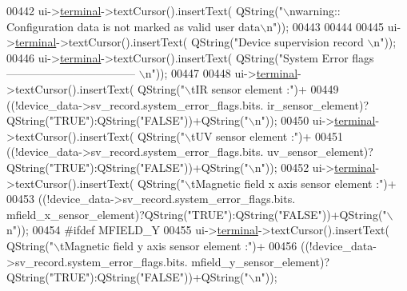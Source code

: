 \begin{DoxyCode}
00442        ui->\hyperlink{a00080_aae71c46ea4546df5994735dee573b2dd}{terminal}->textCursor().insertText( QString(\textcolor{stringliteral}{"\(\backslash\)nwarning:: Configuration data is not marked
       as valid user data\(\backslash\)n"}));
00443 
00444 
00445        ui->\hyperlink{a00080_aae71c46ea4546df5994735dee573b2dd}{terminal}->textCursor().insertText( QString(\textcolor{stringliteral}{"Device supervision record \(\backslash\)n"}));
00446        ui->\hyperlink{a00080_aae71c46ea4546df5994735dee573b2dd}{terminal}->textCursor().insertText( QString(\textcolor{stringliteral}{"System Error flags 
       ----------------------------------- \(\backslash\)n"}));
00447 
00448        ui->\hyperlink{a00080_aae71c46ea4546df5994735dee573b2dd}{terminal}->textCursor().insertText( QString(\textcolor{stringliteral}{"\(\backslash\)tIR sensor element :"})+
00449                                             ((!device\_data->sv\_record.system\_error\_flags.bits.
      ir\_sensor\_element)?QString(\textcolor{stringliteral}{"TRUE"}):QString(\textcolor{stringliteral}{"FALSE"}))+QString(\textcolor{stringliteral}{"\(\backslash\)n"}));
00450        ui->\hyperlink{a00080_aae71c46ea4546df5994735dee573b2dd}{terminal}->textCursor().insertText( QString(\textcolor{stringliteral}{"\(\backslash\)tUV sensor element :"})+
00451                                             ((!device\_data->sv\_record.system\_error\_flags.bits.
      uv\_sensor\_element)?QString(\textcolor{stringliteral}{"TRUE"}):QString(\textcolor{stringliteral}{"FALSE"}))+QString(\textcolor{stringliteral}{"\(\backslash\)n"}));
00452        ui->\hyperlink{a00080_aae71c46ea4546df5994735dee573b2dd}{terminal}->textCursor().insertText( QString(\textcolor{stringliteral}{"\(\backslash\)tMagnetic field x axis sensor element :"})+
00453                                             ((!device\_data->sv\_record.system\_error\_flags.bits.
      mfield\_x\_sensor\_element)?QString(\textcolor{stringliteral}{"TRUE"}):QString(\textcolor{stringliteral}{"FALSE"}))+QString(\textcolor{stringliteral}{"\(\backslash\)n"}));
00454 \textcolor{preprocessor}{#ifdef MFIELD\_Y}
00455        ui->\hyperlink{a00080_aae71c46ea4546df5994735dee573b2dd}{terminal}->textCursor().insertText( QString(\textcolor{stringliteral}{"\(\backslash\)tMagnetic field y axis sensor element :"})+
00456                                             ((!device\_data->sv\_record.system\_error\_flags.bits.
      mfield\_y\_sensor\_element)?QString(\textcolor{stringliteral}{"TRUE"}):QString(\textcolor{stringliteral}{"FALSE"}))+QString(\textcolor{stringliteral}{"\(\backslash\)n"}));

\end{DoxyCode}
